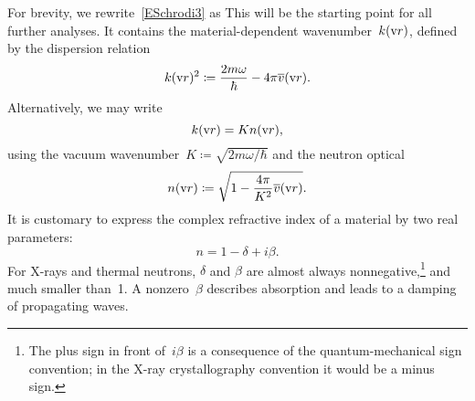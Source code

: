 For brevity, we rewrite~\cref{ESchrodi3} as
%
%
This  will be the starting point for all further analyses.
It contains the material-dependent wavenumber~$k(\text{v}{r})$, defined by the dispersion relation
%
%
%
\begin{equation}\label{Edispersion}
  k(\text{v}{r})^2 \coloneqq \frac{2m\omega}{\hbar} - 4\pi\overline{v}(\text{v}{r}).
\end{equation}
Alternatively, we may write
\begin{equation}\label{Ekkn}
  k(\text{v}{r})=K n(\text{v}{r}),
\end{equation}
using the vacuum wavenumber~$K\coloneqq \sqrt{2m\omega/\hbar}$
%
and the neutron optical 
%
%
%
\begin{equation}\label{EnRefrIndx}
  n(\text{v}{r})\coloneqq \sqrt{1-\frac{4\pi}{K^2}\overline{v}(\text{v}{r})}.
\end{equation}
It is customary to express the complex refractive index of a material
by two real parameters:
\begin{equation}\label{Endb1}
  n =  1-\delta +i\beta.
\end{equation}
%
%
For X-rays and thermal neutrons,
$\delta$ and $\beta$ are almost always nonnegative,\footnote
{The plus sign in front of~$i\beta$ is a consequence of
the quantum-mechanical sign convention;
in the X-ray crystallography convention it would be a minus sign.
%
}
and much smaller than~1.
A nonzero~$\beta$ describes absorption and leads to a damping of propagating waves.
%
%

